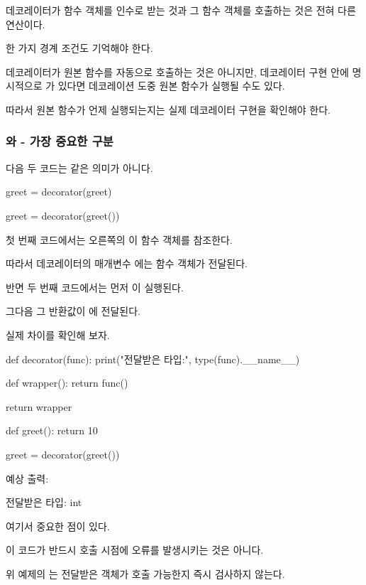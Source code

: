 데코레이터가 함수 객체를 인수로 받는 것과 그 함수 객체를 호출하는 것은 전혀 다른 연산이다.

한 가지 경계 조건도 기억해야 한다.

데코레이터가 원본 함수를 자동으로 호출하는 것은 아니지만, 데코레이터 구현 안에 명시적으로 가 있다면 데코레이션 도중 원본 함수가 실행될 수도 있다.

따라서 원본 함수가 언제 실행되는지는 실제 데코레이터 구현을 확인해야 한다.

\subsubsection{와  - 가장 중요한 구분}

다음 두 코드는 같은 의미가 아니다.

\begin{dhkcode}
greet = decorator(greet)

greet = decorator(greet())
\end{dhkcode}

첫 번째 코드에서는 오른쪽의 이 함수 객체를 참조한다.

따라서 데코레이터의 매개변수 에는 함수 객체가 전달된다.

반면 두 번째 코드에서는 먼저 이 실행된다.

그다음 그 반환값이 에 전달된다.

실제 차이를 확인해 보자.

\begin{dhkcode}
def decorator(func):
    print("전달받은 타입:", type(func).__name__)

    def wrapper():
        return func()

    return wrapper


def greet():
    return 10


greet = decorator(greet())
\end{dhkcode}

예상 출력:

\begin{dhkzsh}
전달받은 타입: int
\end{dhkzsh}

여기서 중요한 점이 있다.

이 코드가 반드시  호출 시점에 오류를 발생시키는 것은 아니다.

위 예제의 는 전달받은 객체가 호출 가능한지 즉시 검사하지 않는다.

